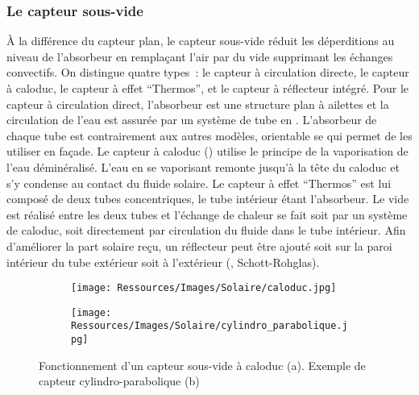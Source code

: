 \subsubsection{Le capteur sous-vide} %
\label{ssub:le_capteur_sous_vide}
À la différence du capteur plan, le capteur sous-vide réduit les déperditions au niveau de
l’absorbeur en remplaçant l’air par du vide supprimant les échanges convectifs. On
distingue quatre types~: le capteur à circulation directe, le capteur à caloduc, le
capteur à effet \enquote{Thermos}, et le capteur à réflecteur intégré. Pour le capteur à
circulation direct, l’absorbeur est une structure plan à ailettes et la circulation de
l’eau est assurée par un système de tube en . L’absorbeur de chaque tube est
contrairement aux autres modèles, orientable se qui permet de les utiliser en façade. Le
capteur à caloduc () utilise le principe de la vaporisation
de l’eau déminéralisé. L’eau en se
vaporisant remonte jusqu’à la tête du caloduc et s’y condense au contact du fluide
solaire. Le capteur à effet \enquote{Thermos} est lui composé de deux tubes concentriques,
le tube intérieur étant l’absorbeur. Le vide est réalisé entre les deux tubes et l’échange
de chaleur se fait soit par un système de caloduc, soit directement par circulation du
fluide dans le tube intérieur. Afin d’améliorer la part solaire reçu, un réflecteur peut
être ajouté soit sur la paroi intérieur du tube extérieur soit à l’extérieur
(, Schott-Rohglas).

\begin{figure}
    \centering
    \begin{subfigure}[b]{0.35\textwidth}
        \texttt{[image: Ressources/Images/Solaire/caloduc.jpg]}
        \caption{}
        \label{fig:capteur_sous_vide}
    \end{subfigure}
    \quad
    \begin{subfigure}[b]{0.55\textwidth}
        \texttt{[image: Ressources/Images/Solaire/cylindro\_parabolique.jpg]}
        \caption{}
        \label{fig:capteur_cylindro_parabolique}
    \end{subfigure}
    \caption[Description des capteurs plans]
             {Fonctionnement d’un capteur sous-vide à caloduc (a). Exemple de
              capteur cylindro-parabolique (b)}
    \label{fig:capteur_vide_parabolique}
\end{figure}


